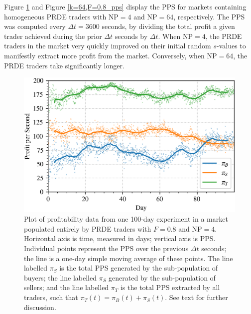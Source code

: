 \documentclass[conference]{IEEEtran}
\begin{document}
Figure \ref{k=4,F=0.8_pps} and Figure \ref{k=64,F=0.8_pps} display the PPS for markets containing homogeneous PRDE traders with $\mathrm{NP=4}$ and $\mathrm{NP}=64$, respectively.
The PPS was computed every $\Delta t=3600$ seconds, by dividing the total profit a given trader achieved during the prior $\Delta t$ seconds by $\Delta t$.
When $\mathrm{NP}=4$, the PRDE traders in the market very quickly improved on their initial random $s$-values to manifestly extract more profit from the market.
Conversely, when $\mathrm{NP}=64$, the PRDE traders take significantly longer.

\begin{figure}[htbp]
    \centerline{\includegraphics[width=\columnwidth]{k=4,F=0.8_pps.png}}
    \caption{
        Plot of profitability data from one 100-day experiment in a market populated entirely by PRDE traders with $F=0.8$ and $\mathrm{NP}=4$.
        Horizontal axis is time, measured in days; vertical axis is PPS. 
        Individual points represent the PPS over the previous $\Delta t$ seconds; the line is a one-day simple moving average of these points.
        The line labelled $\pi_S$ is the total PPS generated by the sub-population of buyers; the line labelled $\pi_S$ generated by the sub-population of sellers; and the line labelled $\pi_T$ is the total PPS extracted by all traders, such that $\pi_T(t)=\pi_B(t)+\pi_S(t)$.
        See text for further discussion.
    }
    \label{k=4,F=0.8_pps}
\end{figure}
\end{document}
